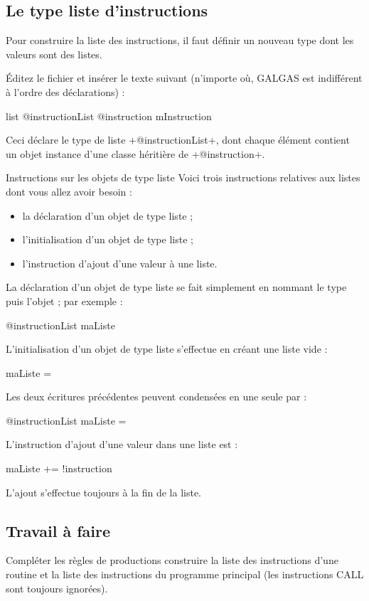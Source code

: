 \subsection{Le type liste d'instructions}
Pour construire la liste des instructions, il faut définir un nouveau type dont les valeurs sont des listes.

Éditez le fichier  et insérer le texte suivant (n’importe où, GALGAS est indifférent à l’ordre des déclarations) :

\begin{galgas}
list @instructionList {
  @instruction mInstruction
}
\end{galgas}

Ceci déclare le type de liste \ggs+@instructionList+, dont chaque élément contient un objet instance d'une classe héritière de \ggs+@instruction+.

Instructions sur les objets de type liste
Voici trois instructions relatives aux listes dont vous allez avoir besoin :
\begin{itemize}
  \item la déclaration d'un objet de type liste ;
  \item l'initialisation d'un objet de type liste ;
  \item l'instruction d'ajout d'une valeur à une liste.
\end{itemize}

La déclaration d'un objet de type liste se fait simplement en nommant le type puis l'objet ; par exemple :
\begin{galgas}
@instructionList maListe
\end{galgas}

L'initialisation d'un objet de type liste s'effectue en créant une liste vide :
\begin{galgas}
maListe = {}
\end{galgas}

Les deux écritures précédentes peuvent condensées en une seule par :
\begin{galgas}
@instructionList maListe = {}
\end{galgas}

L'instruction d'ajout d'une valeur dans une liste est :
\begin{galgas}
maListe += !instruction
\end{galgas}
L'ajout s'effectue toujours à la fin de la liste.

\subsection{Travail à faire}
Compléter les règles de productions construire la liste des instructions d'une routine et la liste des instructions du programme principal (les instructions CALL sont toujours ignorées).

